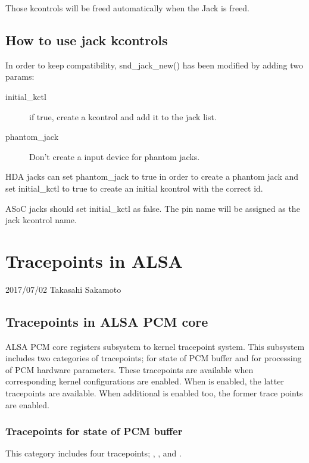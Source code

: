 \documentclass[a4paper,8pt,english]{sphinxmanual}
\begin{document}
Those kcontrols will be freed automatically when the Jack is freed.


\subsection{How to use jack kcontrols}
\label{sound/designs/jack-controls:how-to-use-jack-kcontrols}
In order to keep compatibility, snd\_jack\_new() has been modified by
adding two params:
\begin{description}
\item[{initial\_kctl}] \leavevmode
if true, create a kcontrol and add it to the jack list.

\item[{phantom\_jack}] \leavevmode
Don't create a input device for phantom jacks.

\end{description}

HDA jacks can set phantom\_jack to true in order to create a phantom
jack and set initial\_kctl to true to create an initial kcontrol with
the correct id.

ASoC jacks should set initial\_kctl as false. The pin name will be
assigned as the jack kcontrol name.


\section{Tracepoints in ALSA}
\label{sound/designs/tracepoints::doc}\label{sound/designs/tracepoints:tracepoints-in-alsa}
2017/07/02
Takasahi Sakamoto


\subsection{Tracepoints in ALSA PCM core}
\label{sound/designs/tracepoints:tracepoints-in-alsa-pcm-core}
ALSA PCM core registers  subsystem to kernel tracepoint system.
This subsystem includes two categories of tracepoints; for state of PCM buffer
and for processing of PCM hardware parameters. These tracepoints are available
when corresponding kernel configurations are enabled. When 
is enabled, the latter tracepoints are available. When additional
 is enabled too, the former trace points are enabled.


\subsubsection{Tracepoints for state of PCM buffer}
\label{sound/designs/tracepoints:tracepoints-for-state-of-pcm-buffer}
This category includes four tracepoints; , ,  and
.
\end{document}
